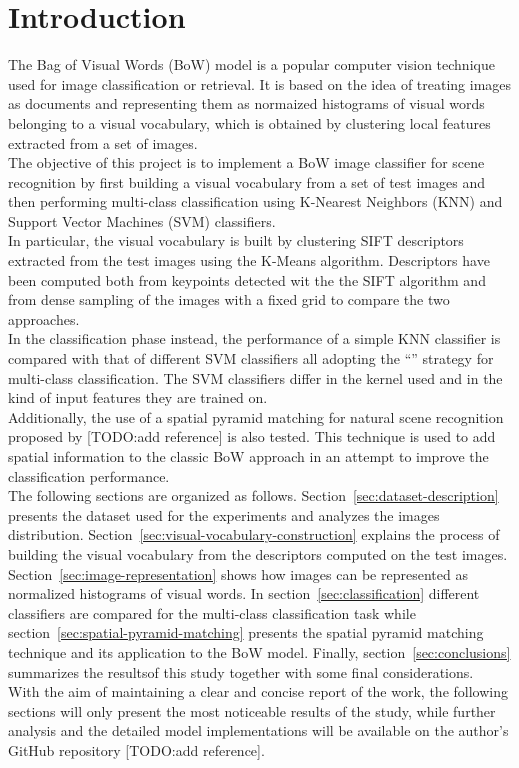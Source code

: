 \documentclass[../main.tex]{subfiles}
\begin{document}
\section{Introduction}

The Bag of Visual Words (BoW) model is a popular computer vision technique used for image classification or retrieval. It is based on the idea of treating images as documents and representing them as normaized histograms of visual words belonging to a visual vocabulary, which is obtained by clustering local features extracted from a set of images.\\
The objective of this project is to implement a BoW image classifier for scene recognition by first building a visual vocabulary from a set of test images and then performing multi-class classification using K-Nearest Neighbors (KNN) and Support Vector Machines (SVM) classifiers.\\
In particular, the visual vocabulary is built by clustering SIFT descriptors extracted from the test images using the K-Means algorithm. Descriptors have been computed both from keypoints detected wit the the SIFT algorithm and from dense sampling of the images with a fixed grid to compare the two approaches.\\
In the classification phase instead, the performance of a simple KNN classifier is compared with that of different SVM classifiers all adopting the ``'' strategy for multi-class classification. The SVM classifiers differ in the kernel used and in the kind of input features they are trained on.\\
Additionally, the use of a spatial pyramid matching for natural scene recognition proposed by  [TODO:add reference] is also tested. This technique is used to add spatial information to the classic BoW approach in an attempt to improve the classification performance.\\
The following sections are organized as follows. Section~\ref{sec:dataset-description} presents the dataset used for the experiments and analyzes the images distribution. Section~\ref{sec:visual-vocabulary-construction} explains the process of building the visual vocabulary from the descriptors computed on the test images. Section~\ref{sec:image-representation} shows how images can be represented as normalized histograms of visual words. In section~\ref{sec:classification} different classifiers are compared for the multi-class classification task while section~\ref{sec:spatial-pyramid-matching} presents the spatial pyramid matching technique and its application to the BoW model. Finally, section~\ref{sec:conclusions} summarizes the resultsof this study together with some final considerations.\\
With the aim of maintaining a clear and concise report of the work, the following sections will only present the most noticeable results of the study, while further analysis and the detailed model implementations will be available on the author’s GitHub repository [TODO:add reference].
\end{document}
